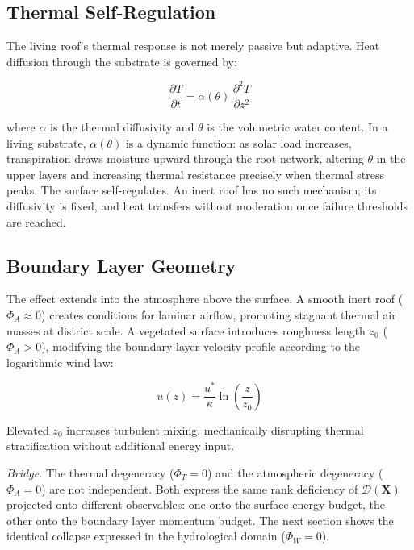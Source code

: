 \documentclass[12pt, a4paper]{article}
\theoremstyle{plain}
\theoremstyle{remark}
\begin{document}
\subsection{Thermal Self-Regulation}

The living roof's thermal response is not merely passive but adaptive. Heat diffusion through the substrate is governed by:

\begin{equation}
\frac{\partial T}{\partial t} = \alpha(\theta)\,\frac{\partial^2 T}{\partial z^2}
\label{eq:diffusion}
\end{equation}

\noindent where $\alpha$ is the thermal diffusivity and $\theta$ is the volumetric water content. In a living substrate, $\alpha(\theta)$ is a dynamic function: as solar load increases, transpiration draws moisture upward through the root network, altering $\theta$ in the upper layers and increasing thermal resistance precisely when thermal stress peaks. The surface self-regulates. An inert roof has no such mechanism; its diffusivity is fixed, and heat transfers without moderation once failure thresholds are reached.

\subsection{Boundary Layer Geometry}

The effect extends into the atmosphere above the surface. A smooth inert roof ($\Phi_A \approx 0$) creates conditions for laminar airflow, promoting stagnant thermal air masses at district scale. A vegetated surface introduces roughness length $z_0$ ($\Phi_A > 0$), modifying the boundary layer velocity profile according to the logarithmic wind law:

\begin{equation}
u(z) = \frac{u^*}{\kappa}\ln\!\left(\frac{z}{z_0}\right)
\label{eq:wind}
\end{equation}

\noindent Elevated $z_0$ increases turbulent mixing, mechanically disrupting thermal stratification without additional energy input.

\medskip
\noindent\textit{Bridge.}\; The thermal degeneracy ($\Phi_T = 0$) and the atmospheric degeneracy ($\Phi_A = 0$) are not independent. Both express the same rank deficiency of $\mathcal{D}(\mathbf{X})$ projected onto different observables: one onto the surface energy budget, the other onto the boundary layer momentum budget. The next section shows the identical collapse expressed in the hydrological domain ($\Phi_W = 0$).
\end{document}
